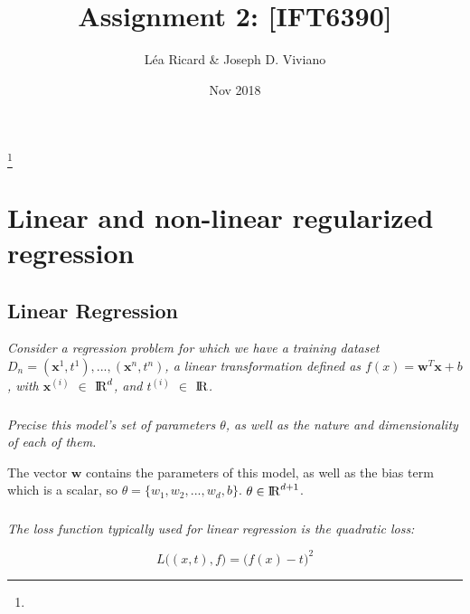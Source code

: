 \documentclass[reqno]{amsart}
\theoremstyle{definition}
\theoremstyle{remark}
\numberwithin{equation}{section}
\begin{document}
\title{Assignment 2: [IFT6390]}

\author{L\'ea Ricard \& Joseph D. Viviano}
\address{Universit\'e de Montr\'eal}
\curraddr{}
\thanks{}
\date{Nov 2018}

\maketitle
\section{Linear and non-linear regularized regression}

\subsection{Linear Regression}

\textit{Consider a regression problem for which we have a training dataset $D_{n}= {(\mathbf{x}^{1}, t^{1}), . . . , (\mathbf{x}^{n}, t^{n})}$, a linear transformation defined as $f(x) = \mathbf{w}^T\mathbf{x} + b$, with $\mathbf{x}^{(i)}$ $\in$ ${\rm I\!R}^{d}$, and $t^{(i)}$ $\in$ ${\rm I\!R}$.}\\

\subsubsection{}
\textit{Precise this model’s set of parameters $\theta$, as well as the nature and dimensionality of each of them.\\}

The vector $\boldsymbol{w}$ contains the parameters of this model, as well as the bias term which is a scalar, so $\theta = \{w_1, w_2, ..., w_d, b\}$.  
$\theta \in {\rm I\!R}^{d+1}$. \\

\subsubsection{}
\textit{The loss function typically used for linear regression is the quadratic
loss:}

\begin{equation}
    L\big((x, t), f\big) = \big(f(x) - t\big)^{2}
\end{equation}
\end{document}
